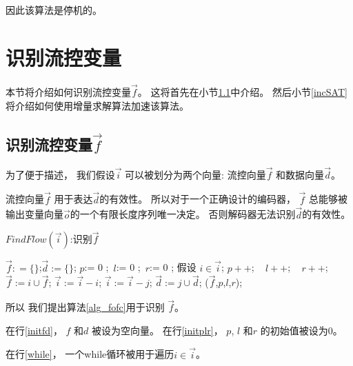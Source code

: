 因此该算法是停机的。



\section{识别流控变量}\label{sec_findfc}
本节将介绍如何识别流控变量$\vec{f}$。
这将首先在小节\ref{basic}中介绍。
然后小节\ref{incSAT}将介绍如何使用增量求解算法加速该算法。

\subsection{识别流控变量$\vec{f}$}\label{basic}

为了便于描述，
我们假设$\vec{i}$ 可以被划分为两个向量:
流控向量$\vec{f}$ 和数据向量$\vec{d}$。

流控向量$\vec{f}$ 用于表达$\vec{d}$的有效性。
所以对于一个正确设计的编码器，
$\vec{f}$ 总能够被输出变量向量$\vec{o}$的一个有限长度序列唯一决定。
否则解码器无法识别$\vec{d}$的有效性。


\begin{algorithm}[b]
\caption{$FindFlow(\vec{i})$:识别$\vec{f}$}
\label{alg_fofc}
\begin{algorithmic}[1]
\STATE $\vec{f}: = \{\}$;$\vec{d}:= \{\}$\label{initfd};
\STATE $p$:= 0 ;~$l$:= 0 ;~$r$:= 0 \label{initplr};
\label{while}
  \STATE 假设 $i\in\vec{i}$;
  \STATE $p++$; ~ $l++$; ~ $r++$;
    \label{adduniq}
    \STATE $\vec{f}:= i\cup\vec{f}$;
    \STATE $\vec{i}:=\vec{i}-i$;
  \label{nonuniqres}
\label{ruleout}      
	\STATE $\vec{i}:=\vec{i}-j$;
	\STATE $\vec{d}:=j\cup\vec{d}$;
      \ENDIF
    \ENDFOR
  \ENDIF
\ENDWHILE
\RETURN ($\vec{f}$,$p$,$l$,$r$);
\end{algorithmic}
\end{algorithm}

所以
我们提出算法\ref{alg_fofc}用于识别 $\vec{f}$。

在行\ref{initfd}，
$f$ 和$d$ 被设为空向量。
在行\ref{initplr}，
$p$, $l$ 和$r$ 的初始值被设为0。

在行\ref{while}，
一个while循环被用于遍历$i\in\vec{i}$。

